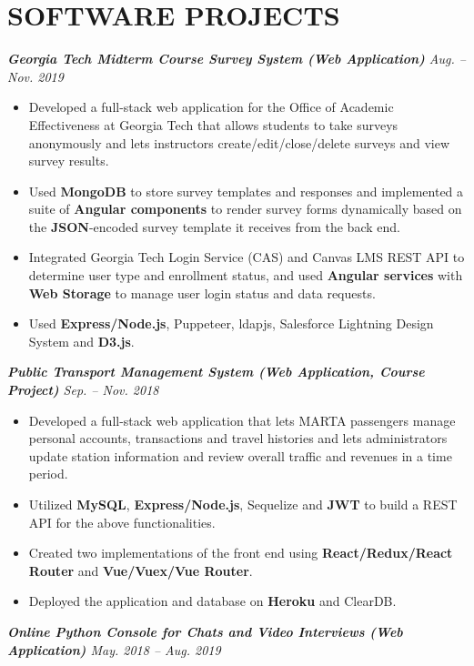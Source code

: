 \documentclass[10pt]{article}
\begin{document}
\section*{SOFTWARE PROJECTS}
{\itshape {\bfseries Georgia Tech Midterm Course Survey System (Web Application)}  \hfill Aug. -- Nov. 2019}
\begin{itemize}[leftmargin=15pt, noitemsep, topsep=0pt]
\item Developed a full-stack web application for the Office of Academic Effectiveness at Georgia Tech that allows students to take surveys anonymously and lets instructors create/edit/close/delete surveys and view survey results.
\item Used \textbf{MongoDB} to store survey templates and responses and implemented a suite of \textbf{Angular components} to render survey forms dynamically based on the \textbf{JSON}-encoded survey template it receives from the back end.
\item Integrated Georgia Tech Login Service (CAS) and Canvas LMS REST API to determine user type and enrollment status, and used \textbf{Angular services} with \textbf{Web Storage} to manage user login status and data requests.
\item Used \textbf{Express/Node.js}, Puppeteer, ldapjs, Salesforce Lightning Design System and \textbf{D3.js}.
\end{itemize}
\vspace{0.5em}
%
{\itshape {\bfseries Public Transport Management System (Web Application, Course Project)} \hfill Sep. -- Nov. 2018}
\begin{itemize}[leftmargin=15pt, noitemsep, topsep=0pt]
\item Developed a full-stack web application that lets MARTA passengers manage personal accounts, transactions and travel histories and lets administrators update station information and review overall traffic and revenues in a time period.
\item Utilized \textbf{MySQL}, \textbf{Express/Node.js}, Sequelize and \textbf{JWT} to build a REST API for the above functionalities.
\item Created two implementations of the front end using \textbf{React/Redux/React Router} and \textbf{Vue/Vuex/Vue Router}. 
\item Deployed the application and database on \textbf{Heroku} and ClearDB.
\end{itemize}
\vspace{0.5em}
%
{\itshape {\bfseries Online Python Console for Chats and Video Interviews (Web Application)}  \hfill May. 2018 -- Aug. 2019}
\end{document}
